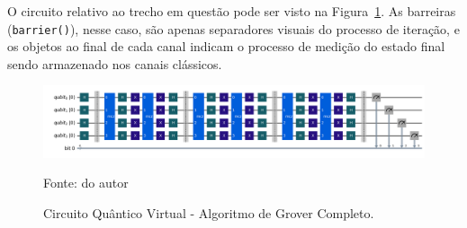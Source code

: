 O circuito relativo ao trecho em questão pode ser visto na Figura~\ref{fig:circuitoCompleto}. As barreiras (\texttt{barrier()}), nesse caso, são apenas separadores visuais do processo de iteração, e os objetos ao final de cada canal indicam o processo de medição do estado final sendo armazenado nos canais clássicos.

\begin{figure}[!thb]
    \centering
    \captionsetup{justification=centering}
    \caption{Circuito Quântico Virtual - Algoritmo de Grover Completo.}
    \label{fig:circuitoCompleto}
    
    \includegraphics[width=\linewidth]{Imagens/circuitoCompleto.png}

    \vspace{0.1em}
    {\small Fonte: do autor} 
\end{figure}